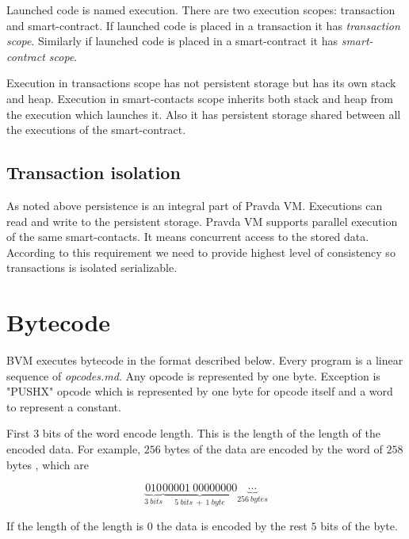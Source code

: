 \documentclass[12pt,a4paper]{article}
\begin{document}
Launched code is named execution. There are two execution scopes: transaction and smart-contract. If launched code is placed in a transaction it has \textit{transaction scope}. Similarly if launched code is placed in a smart-contract it has \textit{smart-contract scope}.

Execution in transactions scope has not persistent storage but has its own stack and heap. Execution in smart-contacts scope inherits both stack and heap from the execution which launches it. Also it has persistent storage shared between all the executions of the smart-contract.

\subsection{Transaction isolation}

As noted above persistence is an integral part of Pravda VM. Executions can read and write to the persistent storage. Pravda VM supports parallel execution of the same smart-contacts. It means concurrent access to the stored data. According to this requirement we need to provide highest level of consistency so transactions is isolated serializable\cite{transaction-isolation}. 

\section{Bytecode}

BVM executes bytecode in the format described below. Every program is a linear sequence of \textit{opcodes.md}. Any opcode is represented by one byte. Exception is "PUSHX" opcode which is represented by one byte for opcode itself and a word to represent a constant.

First 3 bits of the word encode length. This is the length of the length of the encoded data. For example, $256$ bytes of the data are encoded by the word of $258$ bytes , which are

$$\underbrace{010}_{3~bits}\underbrace{00001~00000000}_{5~bits~+~1~byte} \underbrace{\cdots}_{256~bytes} $$

If the length of the length is 0 the data is encoded by the rest $5$ bits of the byte.
\end{document}
